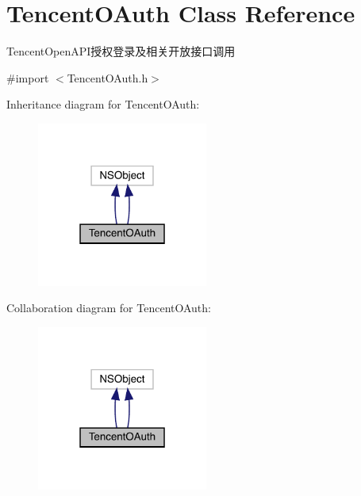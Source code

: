 \hypertarget{interface_tencent_o_auth}{}\section{Tencent\+O\+Auth Class Reference}
\label{interface_tencent_o_auth}


Tencent\+Open\+A\+P\+I授权登录及相关开放接口调用  




{\ttfamily \#import $<$Tencent\+O\+Auth.\+h$>$}



Inheritance diagram for Tencent\+O\+Auth\+:\nopagebreak
\begin{figure}[H]
\begin{center}
\leavevmode
\includegraphics[width=159pt]{interface_tencent_o_auth__inherit__graph}
\end{center}
\end{figure}


Collaboration diagram for Tencent\+O\+Auth\+:\nopagebreak
\begin{figure}[H]
\begin{center}
\leavevmode
\includegraphics[width=159pt]{interface_tencent_o_auth__coll__graph}
\end{center}
\end{figure}
